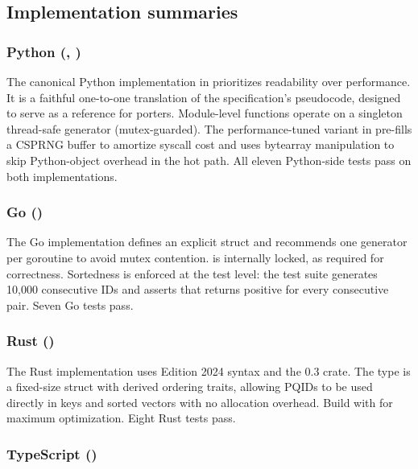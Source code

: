 \subsection{Implementation summaries}

\subsubsection{Python (, )}

The canonical Python implementation in  prioritizes readability over performance. It is a faithful one-to-one translation of the specification's pseudocode, designed to serve as a reference for porters. Module-level functions operate on a singleton thread-safe generator (mutex-guarded). The performance-tuned variant in  pre-fills a CSPRNG buffer to amortize syscall cost and uses bytearray manipulation to skip Python-object overhead in the hot path. All eleven Python-side tests pass on both implementations.

\subsubsection{Go ()}

The Go implementation defines an explicit  struct and recommends one generator per goroutine to avoid mutex contention.  is internally locked, as required for correctness. Sortedness is enforced at the test level: the test suite generates 10{,}000 consecutive IDs and asserts that  returns positive for every consecutive pair. Seven Go tests pass.

\subsubsection{Rust ()}

The Rust implementation uses Edition 2024 syntax and the  0.3 crate. The  type is a fixed-size struct with derived ordering traits, allowing PQIDs to be used directly in  keys and sorted vectors with no allocation overhead. Build with  for maximum optimization. Eight Rust tests pass.

\subsubsection{TypeScript ()}

